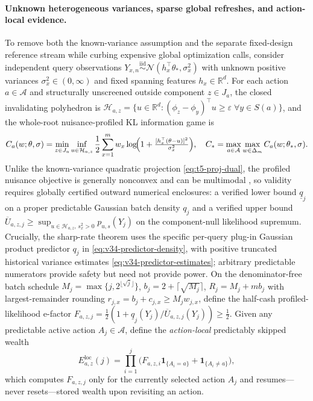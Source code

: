 \documentclass{article}
\theoremstyle{plain}
\theoremstyle{definition}
\begin{document}
\paragraph{Unknown heterogeneous variances, sparse global refreshes, and action-local evidence.}
To remove both the known-variance assumption and the separate fixed-design reference stream while curbing expensive global optimization calls, consider independent query observations $Y_{x,n}\stackrel{\mathrm{iid}}{\sim}\mathcal N(h_x^\top\theta_*,\sigma_x^2)$ with unknown positive variances $\sigma_x^2\in(0,\infty)$ and fixed spanning features $h_x\in\mathbb R^d$. For each action $a\in\mathcal A$ and structurally unscreened outside component $z\in J_a$, the closed invalidating polyhedron is $\mathcal H_{a,z}=\{u\in\mathbb R^d:(\phi_z-\phi_y)^\top u\ge\varepsilon\;\forall y\in S(a)\}$, and the whole-root nuisance-profiled KL information game is
\begin{equation}
C_a(w;\theta,\sigma)=\min_{z\in J_a}\inf_{u\in\mathcal H_{a,z}}\frac12\sum_{x=1}^m w_x\log\!\Bigl(1+\tfrac{[h_x^\top(\theta-u)]^2}{\sigma_x^2}\Bigr),
\quad
C_*=\max_{a\in\mathcal A}\max_{w\in\Delta_m}C_a(w;\theta_*,\sigma).
\label{eq:v34-root-game}
\end{equation}
Unlike the known-variance quadratic projection \eqref{eq:t5-proj-dual}, the profiled nuisance objective is generally nonconvex and can be multimodal \citep{drton2008}, so validity requires globally certified outward numerical enclosures: a verified lower bound $\underline q_j$ on a proper predictable Gaussian batch density $q_j$ and a verified upper bound $\overline U_{a,z,j}\ge\sup_{u\in\mathcal H_{a,z},\,s_x^2>0}p_{u,s}(Y_j)$ on the component-null likelihood supremum. Crucially, the sharp-rate theorem uses the specific per-query plug-in Gaussian product predictor $q_j$ in \eqref{eq:v34-predictor-density}, with positive truncated historical variance estimates \eqref{eq:v34-predictor-estimates}; arbitrary predictable numerators provide safety but need not provide power. On the denominator-free batch schedule $M_j=\max\{j,2^{\lfloor\sqrt j\rfloor}\}$, $b_j=2+\lceil\sqrt{M_j}\rceil$, $R_j=M_j+mb_j$ with largest-remainder rounding $r_{j,x}=b_j+c_{j,x}\ge M_j w_{j,x}$, define the half-cash profiled-likelihood e-factor $F_{a,z,j}=\frac12(1+\underline q_j(Y_j)/\overline U_{a,z,j}(Y_j))\ge\frac12$. Given any predictable active action $A_j\in\mathcal A$, define the \emph{action-local} predictably skipped wealth
\begin{equation}
E_{a,z}^{\mathrm{loc}}(j)=\prod_{i=1}^j \bigl(F_{a,z,i}\mathbf 1_{\{A_i=a\}}+\mathbf 1_{\{A_i\neq a\}}\bigr),
\label{eq:v34-action-local}
\end{equation}
which computes $F_{a,z,j}$ only for the currently selected action $A_j$ and resumes---never resets---stored wealth upon revisiting an action.
\end{document}

